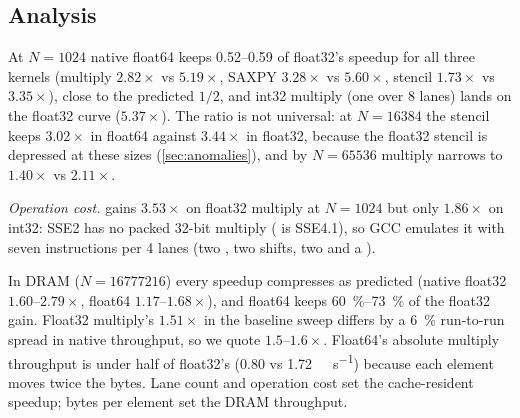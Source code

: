 \subsection{Analysis}
At $N=\num{1024}$ native float64 keeps \numrange{0.52}{0.59} of float32's speedup for all three
kernels (multiply $2.82\times$ vs $5.19\times$, SAXPY $3.28\times$ vs $5.60\times$, stencil
$1.73\times$ vs $3.35\times$), close to the predicted $1/2$, and int32 multiply (one 
over \num{8} lanes) lands on the float32 curve ($5.37\times$). The ratio is not universal: at
$N=\num{16384}$ the stencil keeps $3.02\times$ in float64 against $3.44\times$ in float32, because
the float32 stencil is depressed at these sizes (\cref{sec:anomalies}), and by $N=\num{65536}$
multiply narrows to $1.40\times$ vs $2.11\times$.

\emph{Operation cost.}  gains $3.53\times$ on float32 multiply at $N=\num{1024}$ but
only $1.86\times$ on int32: SSE2 has no packed 32-bit multiply ( is SSE4.1), so GCC
emulates it with seven instructions per \num{4} lanes (two , two shifts, two
 and a ).

In DRAM ($N=\num{16777216}$) every speedup compresses as predicted (native float32
$1.60$--$2.79\times$, float64 $1.17$--$1.68\times$), and float64 keeps \SIrange{60}{73}{\percent} of
the float32 gain. Float32 multiply's $1.51\times$ in the baseline sweep differs by a
\SI{6}{\percent} run-to-run spread in native throughput, so we quote $1.5\text{--}1.6\times$. Float64's absolute multiply
throughput is under half of float32's (\num{0.80} vs \qty{1.72}{\giga\flop\per\second}) because
each element moves twice the bytes. Lane count and operation cost set the cache-resident speedup;
bytes per element set the DRAM throughput.
